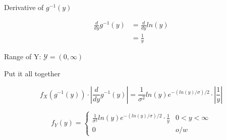 \noindent Derivative of $g^{-1}(y)$

\begin{align*}
	\frac{d}{dy} g^{-1}(y) &= \frac{d}{dy} ln(y) \\
	&= \frac{1}{y}
\end{align*}

Range of Y: $\mathcal{Y} = (0, \infty)$

Put it all together

\[
	f_X(g^{-1}(y)) \cdot \left| \frac{d}{dy} g^{-1}(y) \right| = \frac{1}{\sigma^2} ln(y) e^{-(ln(y)/\sigma)/2} \cdot \left| \frac{1}{y} \right|
\]

\[
	f_Y(y) = \begin{cases}
		\frac{1}{\sigma^2} ln(y) e^{-(ln(y)/\sigma)/2} \cdot \frac{1}{y} & 0 < y < \infty \\
		0 & o/w
	\end{cases}
\]
